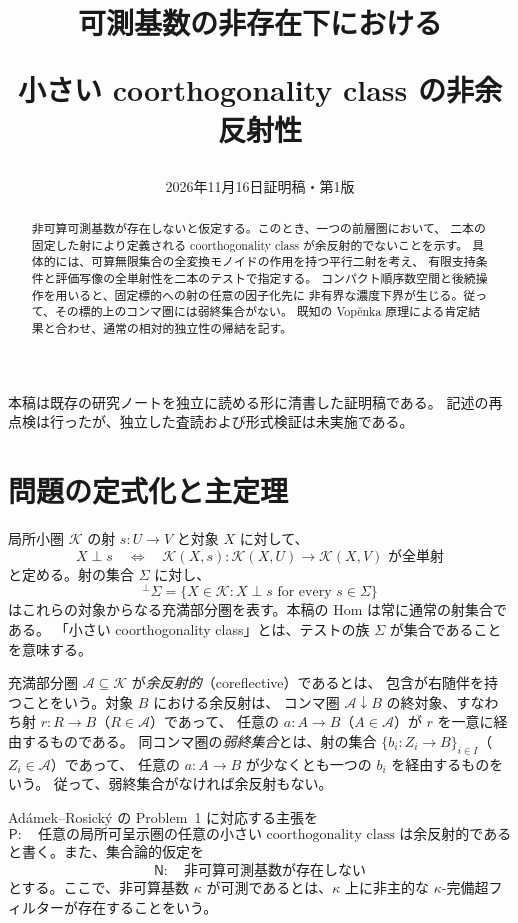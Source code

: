 \documentclass[a4paper,11pt]{ltjsarticle}
\title{可測基数の非存在下における\par
小さい coorthogonality class の非余反射性}
\author{}
\date{2026年11月16日\quad 証明稿・第1版}
\theoremstyle{japaneseplain}
\newcommand{\A}{\mathcal A}
\newcommand{\Naxiom}{\mathsf N}
\newcommand{\Pstmt}{\mathsf P}
\newcommand{\coorth}[1]{{}^{\perp}\!#1}
\begin{document}
\maketitle
\thispagestyle{plain}

\begin{abstract}
非可算可測基数が存在しないと仮定する。このとき、一つの前層圏において、
二本の固定した射により定義される coorthogonality class が余反射的でないことを示す。
具体的には、可算無限集合の全変換モノイドの作用を持つ平行二射を考え、
有限支持条件と評価写像の全単射性を二本のテストで指定する。
コンパクト順序数空間と後続操作を用いると、固定標的への射の任意の因子化先に
非有界な濃度下界が生じる。従って、その標的上のコンマ圏には弱終集合がない。
既知の Vopěnka 原理による肯定結果と合わせ、通常の相対的独立性の帰結を記す。
\end{abstract}

\begingroup
\small
\noindent 本稿は既存の研究ノートを独立に読める形に清書した証明稿である。
記述の再点検は行ったが、独立した査読および形式検証は未実施である。
\par
\endgroup

\section{問題の定式化と主定理}\label{sec:statement}

局所小圏 $\mathcal K$ の射 $s:U\to V$ と対象 $X$ に対して、
\[
 X\perp s
 \quad\Longleftrightarrow\quad
 \mathcal K(X,s):\mathcal K(X,U)\longrightarrow\mathcal K(X,V)
 \text{ が全単射}
\]
と定める。射の集合 $\Sigma$ に対し、
\[
 \coorth{\Sigma}
 =\{X\in\mathcal K: X\perp s\text{ for every }s\in\Sigma\}
\]
はこれらの対象からなる充満部分圏を表す。本稿の Hom は常に通常の射集合である。
「小さい coorthogonality class」とは、テストの族 $\Sigma$ が集合であることを意味する。

充満部分圏 $\A\subseteq\mathcal K$ が\emph{余反射的}（coreflective）であるとは、
包含が右随伴を持つことをいう。対象 $B$ における余反射は、
コンマ圏 $\A\mathbin{\downarrow}B$ の終対象、すなわち射 $r:R\to B$（$R\in\A$）であって、
任意の $a:A\to B$（$A\in\A$）が $r$ を一意に経由するものである。
同コンマ圏の\emph{弱終集合}とは、射の集合
$\{b_i:Z_i\to B\}_{i\in I}$（$Z_i\in\A$）であって、
任意の $a:A\to B$ が少なくとも一つの $b_i$ を経由するものをいう。
従って、弱終集合がなければ余反射もない。

Adámek--Rosický の Problem~1 \cite[p.~295]{AR94} に対応する主張を
\[
 \Pstmt:\quad
 \text{任意の局所可呈示圏の任意の小さい coorthogonality class は余反射的である}
\]
と書く。また、集合論的仮定を
\[
 \Naxiom:\quad \text{非可算可測基数が存在しない}
\]
とする。ここで、非可算基数 $\kappa$ が可測であるとは、$\kappa$ 上に非主的な
$\kappa$-完備超フィルターが存在することをいう。
\end{document}
